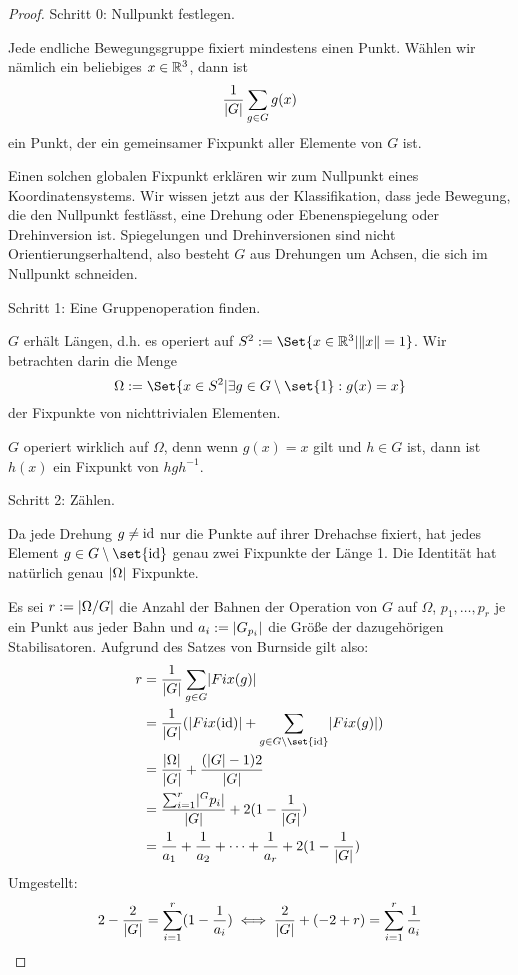 \begin{proof}
Schritt 0: Nullpunkt festlegen.

Jede endliche Bewegungsgruppe fixiert mindestens einen Punkt. Wählen wir nämlich ein beliebiges $x\in\mathbb{R}^3$, dann ist
\[\frac{1}{\lvert G\rvert}\sum_{g\in G} g(x)\]
ein Punkt, der ein gemeinsamer Fixpunkt aller Elemente von $G$ ist.

Einen solchen globalen Fixpunkt erklären wir zum Nullpunkt eines Koordinatensystems. Wir wissen jetzt aus der Klassifikation, dass jede Bewegung, die den Nullpunkt festlässt, eine Drehung oder Ebenenspiegelung oder Drehinversion ist. Spiegelungen und Drehinversionen sind nicht Orientierungserhaltend, also besteht $G$ aus Drehungen um Achsen, die sich im Nullpunkt schneiden.

\medbreak
Schritt 1: Eine Gruppenoperation finden.

$G$ erhält Längen, d.h. es operiert auf $S^2:=\Set{x\in\IR^3 | \norm{x}=1}$. Wir betrachten darin die Menge
\[\Omega:=\Set{x\in S^2 | \exists g\in G\setminus\set{1}: g(x)=x}\]
der Fixpunkte von nichttrivialen Elementen.

$G$ operiert wirklich auf $\Omega$, denn wenn $g(x)=x$ gilt und $h\in G$ ist, dann ist $h(x)$ ein Fixpunkt von $hgh^{-1}$.

\medbreak
Schritt 2: Zählen.

Da jede Drehung $g\neq\operatorname{id}$ nur die Punkte auf ihrer Drehachse fixiert, hat jedes Element $g\in G\setminus\set{\id}$ genau zwei Fixpunkte der Länge 1. Die Identität hat natürlich genau $\lvert\Omega\rvert$ Fixpunkte.

Es sei $r:=\lvert\Omega/G\rvert$ die Anzahl der Bahnen der Operation von $G$ auf $\Omega$, $p_1,\ldots,p_r$ je ein Punkt aus jeder Bahn und $a_i:=\lvert G_{p_i}\rvert$ die Größe der dazugehörigen Stabilisatoren. Aufgrund des Satzes von Burnside gilt also:
\begin{align*}
r &= \frac{1}{\abs{G}}\sum_{g\in G} \abs{Fix(g)} \\
&=\frac{1}{\abs{G}}(\abs{Fix(\id)} + \sum_{g\in G\setminus\set{\id}} \abs{Fix(g)}) \\
&=\frac{\abs{\Omega}}{\abs{G}} + \frac{(\abs{G}-1)2}{\abs{G}} \\
&=\frac{\sum_{i=1}^r \abs{^G p_i}}{\abs{G}} + 2(1-\frac{1}{\abs{G}}) \\
&=\frac{1}{a_1}+\frac{1}{a_2}+\cdots+\frac{1}{a_r}+2(1-\frac{1}{\abs{G}})
\end{align*}
Umgestellt:
\[2-\frac{2}{\lvert G\rvert} = \sum_{i=1}^r(1-\frac{1}{a_i}) \iff \frac{2}{\lvert G\rvert}+(-2+r) =  \sum_{i=1}^r \frac{1}{a_i} \]


\end{proof}
